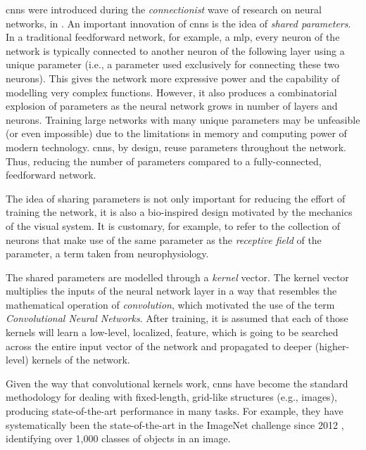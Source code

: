 

\glspl{cnn} were introduced during the \emph{connectionist}
wave of research on neural networks, in
\textcite{lecun1989generalization, lecun1989handwritten}. An
important innovation of \glspl{cnn} is the idea of
\emph{shared parameters}. In a traditional feedforward
network, for example, a \gls{mlp}, every neuron of the
network is typically connected to another neuron of the
following layer using a unique parameter (i.e., a parameter
used exclusively for connecting these two neurons). This
gives the network more expressive power and the capability
of modelling very complex functions. However, it also
produces a combinatorial explosion of parameters as the
neural network grows in number of layers and neurons.
Training large networks with many unique parameters may be
unfeasible (or even impossible) due to the limitations in
memory and computing power of modern technology.
\glspl{cnn}, by design, reuse parameters throughout the
network. Thus, reducing the number of parameters compared to
a fully-connected, feedforward network.

The idea of sharing parameters is not only important for
reducing the effort of training the network, it is also a
bio-inspired design motivated by the mechanics of the visual
system. It is customary, for example, to refer to the
collection of neurons that make use of the same parameter as
the \emph{receptive field} of the parameter, a term taken
from neurophysiology.

The shared parameters are modelled through a \emph{kernel}
vector. The kernel vector multiplies the inputs of the
neural network layer in a way that resembles the
mathematical operation of \emph{convolution}, which
motivated the use of the term \emph{Convolutional Neural
Networks}. After training, it is assumed that each of those
kernels will learn a low-level, localized, feature, which is
going to be searched across the entire input vector of the
network and propagated to deeper (higher-level) kernels of
the network.

Given the way that convolutional kernels work, \glspl{cnn}
have become the standard methodology for dealing with
fixed-length, grid-like structures (e.g., images), producing
state-of-the-art performance in many tasks. For example,
they have systematically been the state-of-the-art in the
ImageNet challenge since 2012
\parencite{krizhevsky2012imagenet}, identifying over 1,000
classes of objects in an image.

